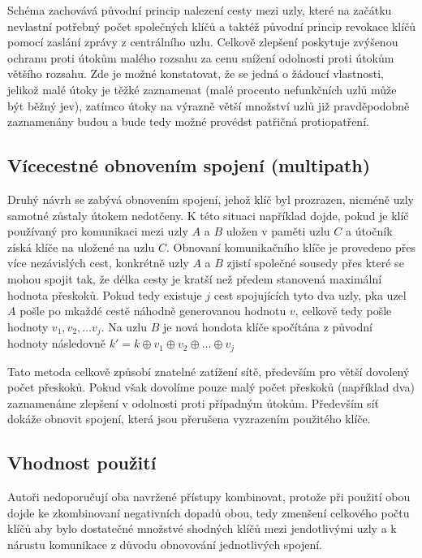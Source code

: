 \documentclass[11pt,final,twoside]{fithesis2}
\begin{document}
Schéma zachovává původní princip nalezení cesty mezi uzly, které na začátku nevlastní potřebný počet společných klíčů a taktéž původní princip revokace klíčů pomocí zaslání zprávy z 
centrálního uzlu. Celkově zlepšení poskytuje zvýšenou ochranu proti útokům malého rozsahu za cenu snížení odolnosti proti útokům většího rozsahu. Zde je možné konstatovat, že se jedná 
o žádoucí vlastnosti, jelikož malé útoky je těžké zaznamenat (malé procento nefunkčních uzlů může být běžný jev), zatímco útoky na výrazně větší množství uzlů již pravděpodobně zaznamenány budou a 
bude tedy možné provédst patřičná protiopatření. 

\subsection{Vícecestné obnovením spojení (multipath)}
Druhý návrh se zabývá obnovením spojení, jehož klíč byl prozrazen, nicméně uzly samotné zůstaly útokem nedotčeny. K této situaci například dojde, pokud je klíč používaný pro komunikaci mezi
uzly $A$ a $B$ uložen v paměti uzlu $C$ a útočník získá klíče na uložené na uzlu $C$. Obnovaní komunikačního klíče je provedeno přes více nezávislých cest, konkrétně uzly $A$ a $B$ zjistí společné sousedy
přes které se mohou spojit tak, že délka cesty je kratší než předem stanovená maximální hodnota přeskoků. Pokud tedy existuje $j$ cest spojujících tyto dva uzly, pka uzel $A$ pošle po mkaždé cestě náhodně 
generovanou hodnotu $v$, celkově tedy pošle hodnoty $v_1, v_2, \dots v_j$. Na uzlu $B$ je nová hondota klíče spočítána z původní hodnoty následovně $k' = k \oplus v_1 \oplus v_2 \oplus \dots \oplus v_j$

Tato metoda celkově způsobí znatelné zatížení sítě, především pro větší dovolený počet přeskoků. Pokud však dovolíme pouze malý počet přeskoků (například dva) zaznamenáme zlepšení v odolnosti proti 
případným útokům. Především síť dokáže obnovit spojení, která jsou přerušena vyzrazením použitého klíče.

\subsection{Vhodnost použití}
Autoři nedoporučují oba navržené přístupy kombinovat, protože při použití obou dojde ke zkombinovaní negativních dopadů obou, tedy zmenšení celkového počtu klíčů aby bylo dostatečné množstvé shodných
klíčů mezi jendotlivými uzly a k nárustu komunikace z důvodu obnovování jednotlivých spojení. 
\end{document}
